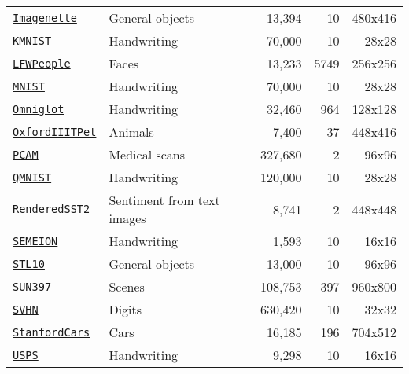 \begin{table}[htbp]
\begin{tabular}{llrrr}
\href{https://github.com/fastai/imagenette#imagenette-1}{\texttt{Imagenette}} & General objects & 13,394 & 10 & 480x416 \\
\href{https://github.com/rois-codh/kmnist}{\texttt{KMNIST}} & Handwriting & 70,000 & 10 & 28x28 \\
\href{http://vis-www.cs.umass.edu/lfw/}{\texttt{LFWPeople}} & Faces & 13,233 & 5749 & 256x256 \\
\href{http://yann.lecun.com/exdb/mnist/}{\texttt{MNIST}} & Handwriting & 70,000 & 10 & 28x28 \\
\href{https://github.com/brendenlake/omniglot}{\texttt{Omniglot}} & Handwriting & 32,460 & 964 & 128x128 \\
\href{https://www.robots.ox.ac.uk/~vgg/data/pets/}{\texttt{OxfordIIITPet}} & Animals & 7,400 & 37 & 448x416 \\
\href{https://github.com/basveeling/pcam}{\texttt{PCAM}} & Medical scans & 327,680 & 2 & 96x96 \\
\href{https://github.com/facebookresearch/qmnist}{\texttt{QMNIST}} & Handwriting & 120,000 & 10 & 28x28 \\
\href{https://github.com/openai/CLIP/blob/main/data/rendered-sst2.md}{\texttt{RenderedSST2}} & Sentiment from text images & 8,741 & 2 & 448x448 \\
\href{https://archive.ics.uci.edu/dataset/178/semeion+handwritten+digit}{\texttt{SEMEION}} & Handwriting & 1,593 & 10 & 16x16 \\
\href{https://cs.stanford.edu/~acoates/stl10/}{\texttt{STL10}} & General objects & 13,000 & 10 & 96x96 \\
\href{https://vision.princeton.edu/projects/2010/SUN/}{\texttt{SUN397}} & Scenes & 108,753 & 397 & 960x800 \\
\href{http://ufldl.stanford.edu/housenumbers/}{\texttt{SVHN}} & Digits & 630,420 & 10 & 32x32 \\
\href{https://www.kaggle.com/datasets/jessicali9530/stanford-cars-dataset}{\texttt{StanfordCars}} & Cars & 16,185 & 196 & 704x512 \\
\href{https://www.csie.ntu.edu.tw/~cjlin/libsvmtools/datasets/multiclass.html#usps}{\texttt{USPS}} & Handwriting & 9,298 & 10 & 16x16 \\
\bottomrule
\end{tabular}
\end{table}
